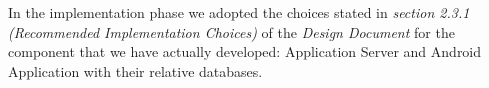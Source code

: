 In the implementation phase we adopted the choices stated in \textit{section 2.3.1 (Recommended Implementation Choices)} of the \textit{Design Document} for the component that we have actually developed: Application Server and Android Application with their relative databases.